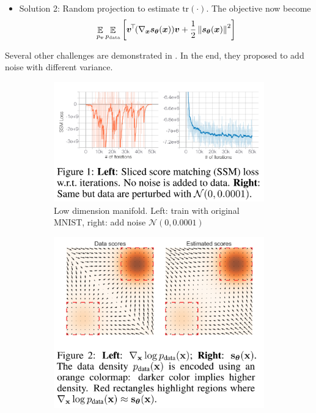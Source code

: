 \documentclass[10pt,xcolor={usenames,dvipsnames,table}]{beamer}
\begin{document}
\begin{frame}
    \begin{itemize}
        \item Solution 2: \parencite{song2020sliced} Random projection to estimate $\text{tr}(\cdot)$. The objective now become
            \[
            \mathop{\mathbb{E}}_{p_{\bm{v}}} \mathop{\mathbb{E}}_{p_{\text{data}}} \left[ \bm{v}^{\!\top\!} (\nabla_{\bm{x}} \bm{s}_{\boldsymbol \theta}(\bm{x})) \bm{v} + \dfrac{1}{2} \left\lVert\bm{s}_{\boldsymbol \theta}(\bm{x})\right\rVert^2\right]
            \] 
    \end{itemize}
    Several other challenges are demonstrated in \parencite{song2020score}. In the end, they proposed to add noise with different variance.
    \begin{figure}
        \centering
        \begin{subfigure}{0.50\textwidth}
            \includegraphics[width=\textwidth,trim={0 6.2cm 0 0},clip]{images/manifold.png}
            \caption{Low dimension manifold. Left: train with original MNIST, right: add noise $\mathcal{N}(0, 0.0001)$ }
        \end{subfigure}
        \begin{subfigure}{0.35\textwidth}
            \includegraphics[width=\textwidth,trim={0 11cm 0 0},clip]{images/inaccurate_score.png}

\end{subfigure}
\end{figure}
\end{frame}
\end{document}
